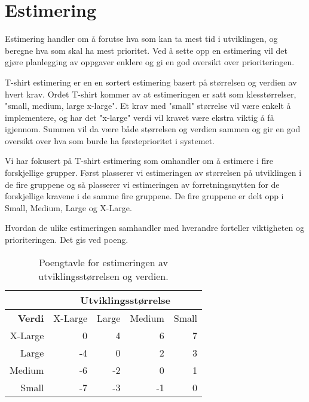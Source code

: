 \section{Estimering}

Estimering handler om å forutse hva som kan ta mest tid i utviklingen, og beregne hva som skal ha mest prioritet. Ved å sette opp en estimering vil det gjøre planlegging av oppgaver enklere og gi en god oversikt over prioriteringen.


T-shirt estimering er en en sortert estimering basert på størrelsen og verdien av hvert krav. Ordet T-shirt kommer av at estimeringen er satt som klesstørrelser, "small, medium, large x-large". Et krav med "small" størrelse vil være enkelt å implementere, og har det "x-large" verdi vil kravet være ekstra viktig å få igjennom. Summen vil da være både størrelsen og verdien sammen og gir en god oversikt over hva som burde ha førsteprioritet i systemet.

Vi har fokusert på T-shirt estimering som omhandler om å estimere i fire forskjellige grupper. Først plasserer vi estimeringen av størrelsen på utviklingen i de fire gruppene og så plasserer vi estimeringen av forretningsnytten for de forskjellige kravene i de samme fire gruppene.
De fire gruppene er delt opp i Small, Medium, Large og X-Large.

Hvordan de ulike estimeringen samhandler med hverandre forteller viktigheten og prioriteringen. Det gis ved poeng.


\begin{table}[H]
\centering
\begin{tabular}{r|r|r|r|r|}
\cline{2-5}
\multicolumn{1}{l|}{}         & \multicolumn{4}{c|}{\textbf{Utviklingsstørrelse}}                                                                             \\ \hline
\multicolumn{1}{|r|}{\textbf{Verdi}}   & \multicolumn{1}{l|}{X-Large} & \multicolumn{1}{l|}{Large} & \multicolumn{1}{l|}{Medium} & \multicolumn{1}{l|}{Small} \\ \hline
\multicolumn{1}{|r|}{X-Large} & 0                            & 4                          & 6                           & 7                          \\ \hline
\multicolumn{1}{|r|}{Large}   & -4                           & 0                          & 2                           & 3                          \\ \hline
\multicolumn{1}{|r|}{Medium}  & -6                           & -2                         & 0                           & 1                          \\ \hline
\multicolumn{1}{|r|}{Small}   & -7                           & -3                         & -1                          & 0                          \\ \hline
\end{tabular}
\caption{Poengtavle for estimeringen av utviklingsstørrelsen og verdien.}
\label{tab:poengestimering}
\end{table}

